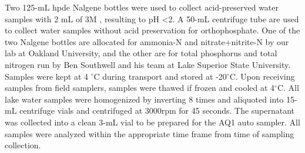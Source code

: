 Two 125-mL \gls{hpde} Nalgene bottles were used to collect acid-preserved water samples with 2 mL of 3M , resulting to pH \textless 2. A 50-mL centrifuge tube are used to collect water samples without acid preservation for orthophosphate. One of the two Nalgene bottles are allocated for ammonia-N and nitrate+nitrite-N by our lab at Oakland University, and the other are for total phosphorus and total nitrogen run by Ben Southwell and his team at Lake Superior State University.  Samples were kept  at 4 $^\circ$C during transport and stored at -20$^\circ$C. Upon receiving samples from field samplers, samples were thawed if frozen and cooled at 4$^\circ$C. All lake water samples were homogenized by inverting 8 times and aliquoted into 15-mL centrifuge vials and centrifuged at 3000rpm for 45 seconds. The supernatant was collected into a clean 3-mL vial to be prepared for the AQ1 auto sampler. All samples were analyzed within the appropriate time frame from time of sampling collection.

